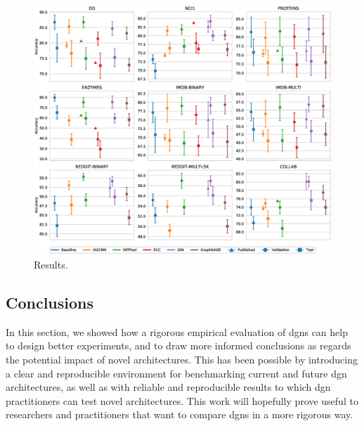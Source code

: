 \begin{figure}[h!]
    \centering
    \includegraphics[width=\linewidth]{Figures/Chapter4/07-comparison-results.eps}
    \caption{Results.}
    \label{fig:comparison-plot}
\end{figure}

\subsection{Conclusions}
In this section, we showed how a rigorous empirical evaluation of \glspl{dgn} can help to design better experiments, and to draw more informed conclusions as regards the potential impact of novel architectures. This has been possible by introducing a clear and reproducible environment for benchmarking current and future \gls{dgn} architectures, as well as with reliable and reproducible results to which \gls{dgn} practitioners can test novel architectures. This work will hopefully prove useful to researchers and practitioners that want to compare \glspl{dgn} in a more rigorous way.

